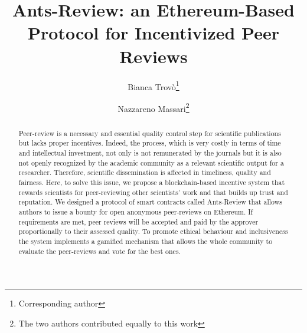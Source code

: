 \documentclass[runningheads]{llncs}
\begin{document}
%
\title{Ants-Review: an Ethereum-Based Protocol for Incentivized Peer Reviews}
%
%
\author{Bianca Trovò\thanks{Corresponding author}\and
Nazzareno Massari\thanks{The two authors contributed equally to this work}}
%
%
%
\maketitle              %
%
\begin{abstract}
Peer-review is a necessary and essential quality control step for scientific publications but lacks proper  incentives. Indeed, the process, which is very costly in terms of time and intellectual investment, not only is not remunerated by the journals but it is also not openly recognized by the academic community as a relevant scientific output for a researcher. Therefore, scientific dissemination is affected in timeliness, quality and fairness. Here, to solve this issue, we propose a blockchain-based incentive system that rewards scientists for peer-reviewing other scientists’ work and that builds up trust and reputation. We designed a protocol of smart contracts called Ants-Review that allows authors to issue a bounty for open anonymous peer-reviews on Ethereum. If requirements are met, peer reviews will be accepted and paid by the approver proportionally to their assessed quality. To promote ethical behaviour and inclusiveness the system implements a gamified mechanism that allows the whole community to evaluate the peer-reviews and vote for the best ones.
\end{abstract}
%
%
\end{document}
